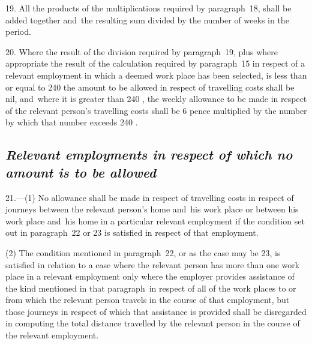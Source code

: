 \documentclass[12pt,a4paper]{article}
\begin{document}
\medskip

19.  All the products of the multiplications required by paragraph~18, shall be added together and~the resulting sum divided by the number of weeks in the period.

\medskip

20.  Where the result of the division required by paragraph~19, plus where appropriate the result of the calculation required by paragraph~15 in respect of a relevant employment in which a deemed work place has been selected, is less than or equal to 
240  %
the amount to be allowed in respect of travelling costs shall be nil, and~where it is greater than 
240%
, the weekly allowance to be made in respect of the relevant person’s travelling costs shall be 
6 pence  %
multiplied by the number by which that number exceeds 
240%
.


\subsection*{\itshape Relevant employments in respect of which no amount is to be allowed}

21.—(1) No allowance shall be made in respect of travelling costs in respect of journeys between the relevant person’s home and~his work place or between his work place and~his home in a particular relevant employment if the condition set out in paragraph~22 or 23 is satisfied in respect of that employment.

(2) The condition mentioned in paragraph~22, or as the case may be 23, is satisfied in relation to a case where the relevant person has more than one work place in a relevant employment only where the employer provides assistance of the kind mentioned in that paragraph~in respect of all of the work places to or from which the relevant person travels in the course of that employment, but those journeys in respect of which that assistance is provided shall be disregarded in computing the total distance travelled by the relevant person in the course of the relevant employment.

\medskip
\end{document}
